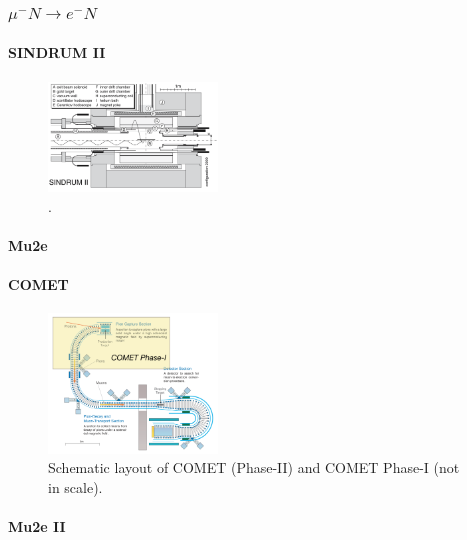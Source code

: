 \subsubsection{$\mu^- N \rightarrow e^- N $}
\paragraph{SINDRUM II}
\cite{SINDRUMII:2006dvw}
\begin{figure}[!h]
\centering
\includegraphics[width =0.4\textwidth]{figures/png/Screenshot_20240307_163120.png}
\caption{.}
\label{fig:sindrumii}
\end{figure}
\paragraph{Mu2e}
\paragraph{COMET}
\cite{Abramishvili_2020}
\begin{figure}[!h]
\centering
\includegraphics[width =0.4\textwidth]{figures/png/Screenshot_20240307_152133.png}
\caption{Schematic layout of COMET (Phase-II) and COMET Phase-I (not in scale).}
\label{fig:comet}
\end{figure}
\paragraph{Mu2e II}
\cite{dukes}
